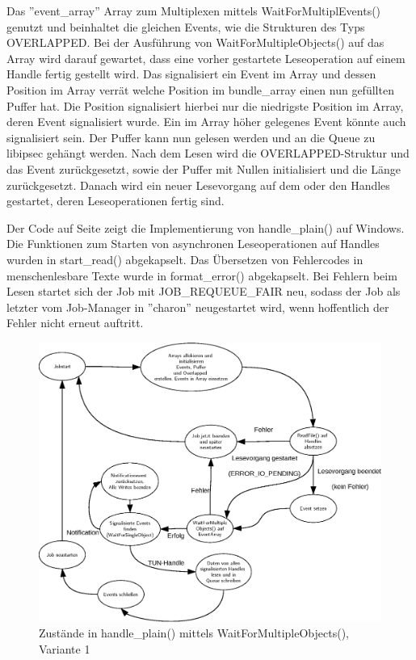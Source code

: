 {Das ''event\_array'' Array zum Multiplexen mittels WaitForMultiplEvents() genutzt und
beinhaltet die gleichen Events, wie die Strukturen des Typs OVERLAPPED.
Bei der Ausführung von WaitForMultipleObjects() auf das Array wird darauf gewartet, dass
eine vorher gestartete Leseoperation auf einem Handle fertig gestellt wird.
Das signalisiert ein Event im Array und dessen Position im Array verrät welche
Position im bundle\_array einen nun gefüllten Puffer hat. Die Position signalisiert
hierbei nur die niedrigste Position im Array, deren Event signalisiert wurde. Ein
im Array höher gelegenes Event könnte auch signalisiert sein.
Der Puffer kann nun gelesen
werden und an die Queue zu libipsec gehängt werden. Nach dem Lesen wird die OVERLAPPED-Struktur
und das Event zurückgesetzt, sowie der Puffer mit Nullen initialisiert und die Länge zurückgesetzt.
Danach wird ein neuer Lesevorgang auf dem oder den Handles gestartet, deren Leseoperationen
fertig sind.

Der Code auf Seite \pageref{lst:handle-plain-windows} zeigt die Implementierung von handle\_plain()
auf Windows. Die Funktionen zum Starten von asynchronen Leseoperationen auf Handles
wurden in start\_read() abgekapselt. Das Übersetzen von Fehlercodes in menschenlesbare
Texte wurde in format\_error() abgekapselt. Bei Fehlern beim Lesen startet sich der Job
mit JOB\_REQUEUE\_FAIR neu, sodass der Job als letzter vom Job-Manager in ''charon'' neugestartet wird,
wenn hoffentlich der Fehler nicht erneut auftritt.

\begin{figure}
\centering
\def\svgwidth{\columnwidth}
\includegraphics[width=\textwidth]{WaitForMultipleObjects.eps}
\caption{Zustände in handle\_plain() mittels WaitForMultipleObjects(), Variante 1}
\label{fig:WaitForMultipleObjects}
\end{figure}

}
